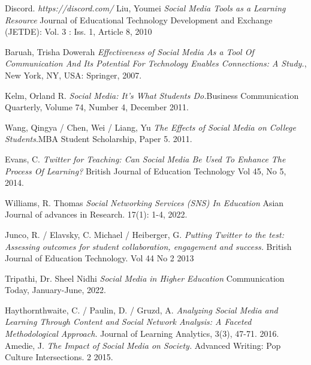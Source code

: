 \documentclass[lettersize,journal]{IEEEtran}
\begin{document}
\begin{thebibliography}{}

        Discord. {\it{https://discord.com/}}
        Liu, Youmei {\it{Social Media Tools as a Learning Resource}} Journal of Educational Technology Development and Exchange (JETDE): Vol. 3 : Iss. 1, Article 8, 2010

    Baruah, Trisha Dowerah {\it{Effectiveness of Social Media As a Tool Of Communication And Its Potential For Technology Enables Connections: A Study.}}, New York, NY, USA: Springer, 2007.

    Kelm, Orland R. {\it{Social Media: It's What Students Do.}}Business Communication Quarterly, Volume 74, Number 4, December 2011.

        Wang, Qingya / Chen, Wei / Liang, Yu {\it{The Effects of Social Media on College Students}}.MBA Student Scholarship, Paper 5. 2011.

        Evans, C. {\it{Twitter for Teaching: Can Social Media Be Used To Enhance The Process Of Learning?}} British Journal of Education Technology Vol 45, No 5, 2014.

        Williams, R. Thomas {\it{Social Networking Services (SNS) In Education}}
        Asian Journal of advances in Research. 17(1): 1-4, 2022.

        Junco, R. / Elavsky, C. Michael / Heiberger, G. {\it{Putting Twitter to
        the test: Assessing outcomes for student collaboration, engagement and
        success.}} British Journal of Education Technology. Vol 44 No 2 2013

        Tripathi, Dr. Sheel Nidhi {\it{Social Media in Higher Education}}
        Communication Today, January-June, 2022.

    Haythornthwaite, C. / Paulin, D. / Gruzd, A. {\it{Analyzing Social Media
        and Learning Through Content and Social Network Analysis: A Faceted
        Methodological Approach.}} Journal of Learning Analytics, 3(3), 47-71.
        2016.
        Amedie, J. {\it{The Impact of Social Media on Society.}} Advanced Writing: Pop Culture Intersections. 2 2015.


\end{thebibliography}
\end{document}
